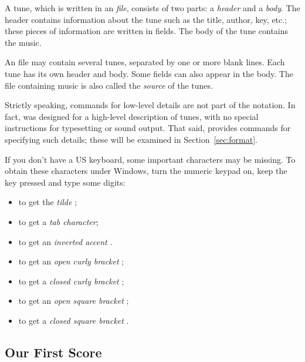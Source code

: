 \documentclass[a4paper,fullpage,12pt]{book}
\begin{document}
A tune, which is written in an \emph{\ABC{} file}, consists of two
parts: a \emph{header} and a \emph{body}. The header contains
information about the tune such as the title, author, key, etc.; these
pieces of information are written in fields. The body of the tune
contains the music.

An \ABC{} file may contain several tunes, separated by one or more
blank lines. Each tune has its own header and body. Some fields can
also appear in the body. The file containing \ABC{} music is also
called the \emph{source} of the tunes.

Strictly speaking, commands for low-level details are not part of the
notation. In fact, \ABC{} was designed for a high-level description of
tunes, with no special instructions for typesetting or sound output.
That said, \ABCPLUS{} provides commands for specifying such details;
these will be examined in Section~\ref{sec:format}.

If you don't have a US keyboard, some important characters may be
missing. To obtain these characters under Windows, turn the numeric
keypad on, keep the  key pressed and type some digits:

\begin{itemize}
  
  \item {} to get the \emph{tilde} \car{\textasciitilde};
  
  \item {} to get a \emph{tab character};
  
  \item {} to get an \emph{inverted accent} .
  
  \item {} to get an \emph{open curly bracket} \car{\{};
  
  \item {} to get a \emph{closed curly bracket} \car{\}};
  
  \item {} to get an \emph{open square bracket} \car{[};
  
  \item {} to get a \emph{closed square bracket} \car{]}.
  
\end{itemize}


\subsection{Our First Score}
\label{sec:first}
\end{document}
